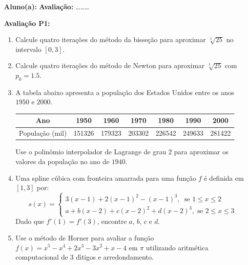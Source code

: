 \documentclass[a4paper,5pt]{amsbook}
\begin{document}
\vspace{0.5cm}
{\bf Aluno(a):}\dotfill{} \textbf{Avalia\c{c}\~ao:} \ldots{}\ldots{}\ldots{} %

\vspace{1cm}
\textbf{Avalia\c{c}\~ao P1:}
\begin{enumerate}
	\item Calcule quatro itera\c{c}\~oes do m\'etodo da bisse\c{c}\~ao para aproximar
		$\sqrt[3]{25}$ no intervalo $[0, 3]$.
	\item Calcule quatro itera\c{c}\~oes do m\'etodo de Newton para aproximar
		$\sqrt[3]{25}$ com $p_0=1.5$.
	\item A tabela abaixo apresenta a popula\c{c}\~ao dos Estados Unidos entre os
		anos $1950$ e $2000$.
		\begin{table}[h]
			\begin{tabular}{c|c|c|c|c|c|c}  %
				Ano & 1950 & 1960 & 1970 & 1980 & 1990 & 2000 \\
				\hline{}  %
				Popula\c{c}\~ao (mil) & 151326 & 179323 & 203302 &
				226542 & 249633 & 281422
			\end{tabular}
		\end{table}

		\noindent{}Use o polin\^omio interpolador de Lagrange de grau 2 para aproximar os
		valores da popula\c{c}\~ao no ano de $1940$.
	\item Uma spline c\'ubica com fronteira amarrada para uma fun\c{c}\~ao $f$ \'e
		definida em $[1,3]$ por:
		\[s(x) = \left\{\begin{array}{l}
					3(x-1) + 2(x-1)^2 - (x-1)^3,\ \text{ se } 1\le x\le 2 \\
					a + b(x-2) + c(x-2)^2 + d(x-2)^3, \text{ se } 2\le x\le 3
				\end{array}\right.\]
		Dado que $f'(1)=f'(3)$, encontre $a$, $b$, $c$ e $d$.
	\item Use o m\'etodo de Horner para avaliar a fun\c{c}\~ao $f(x) = x^5 - x^4 +
		2x^3 - 3x^2 + x - 4$ em $\pi$ utilizando aritm\'etica computacional de 3
		d\'{\i}tigos e arredondamento.
\end{enumerate}
\end{document}
